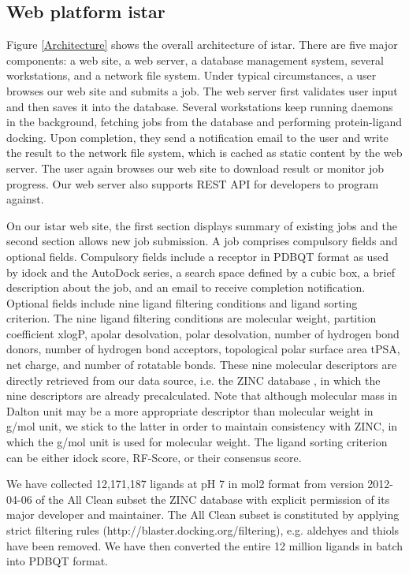 \documentclass[10pt]{article}
\begin{document}
\subsection*{Web platform istar}
Figure \ref{Architecture} shows the overall architecture of istar. There are five major components: a web site, a web server, a database management system, several workstations, and a network file system. Under typical circumstances, a user browses our web site and submits a job. The web server first validates user input and then saves it into the database. Several workstations keep running daemons in the background, fetching jobs from the database and performing protein-ligand docking. Upon completion, they send a notification email to the user and write the result to the network file system, which is cached as static content by the web server. The user again browses our web site to download result or monitor job progress. Our web server also supports REST API for developers to program against.

On our istar web site, the first section displays summary of existing jobs and the second section allows new job submission. A job comprises compulsory fields and optional fields. Compulsory fields include a receptor in PDBQT format as used by idock and the AutoDock series, a search space defined by a cubic box, a brief description about the job, and an email to receive completion notification. Optional fields include nine ligand filtering conditions and ligand sorting criterion. The nine ligand filtering conditions are molecular weight, partition coefficient xlogP, apolar desolvation, polar desolvation, number of hydrogen bond donors, number of hydrogen bond acceptors, topological polar surface area tPSA, net charge, and number of rotatable bonds. These nine molecular descriptors are directly retrieved from our data source, i.e. the ZINC database \cite{532,1178}, in which the nine descriptors are already precalculated. Note that although molecular mass in Dalton unit may be a more appropriate descriptor than molecular weight in g/mol unit, we stick to the latter in order to maintain consistency with ZINC, in which the g/mol unit is used for molecular weight. The ligand sorting criterion can be either idock score, RF-Score, or their consensus score.

We have collected 12,171,187 ligands at pH 7 in mol2 format from version 2012-04-06 of the All Clean subset the ZINC database \cite{532,1178} with explicit permission of its major developer and maintainer. The All Clean subset is constituted by applying strict filtering rules (http://blaster.docking.org/filtering), e.g. aldehyes and thiols have been removed. We have then converted the entire 12 million ligands in batch into PDBQT format.
\end{document}

